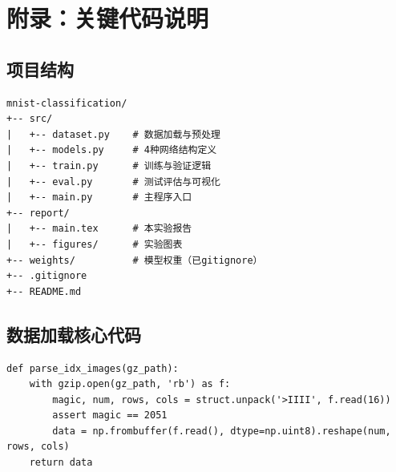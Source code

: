 \documentclass[12pt,a4paper]{article}
\begin{document}
\section{附录：关键代码说明}

\subsection{项目结构}
\begin{lstlisting}
mnist-classification/
+-- src/
|   +-- dataset.py    # 数据加载与预处理
|   +-- models.py     # 4种网络结构定义
|   +-- train.py      # 训练与验证逻辑
|   +-- eval.py       # 测试评估与可视化
|   +-- main.py       # 主程序入口
+-- report/
|   +-- main.tex      # 本实验报告
|   +-- figures/      # 实验图表
+-- weights/          # 模型权重（已gitignore）
+-- .gitignore
+-- README.md
\end{lstlisting}

\subsection{数据加载核心代码}
\begin{lstlisting}
def parse_idx_images(gz_path):
    with gzip.open(gz_path, 'rb') as f:
        magic, num, rows, cols = struct.unpack('>IIII', f.read(16))
        assert magic == 2051
        data = np.frombuffer(f.read(), dtype=np.uint8).reshape(num, rows, cols)
    return data
\end{lstlisting}
\end{document}
